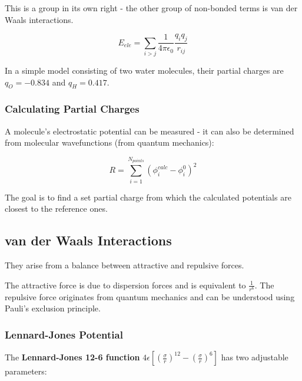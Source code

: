 \documentclass[
  letterpaper,
  DIV=11,
  numbers=noendperiod]{scrreprt}
\begin{document}
This is a group in its own right - the other group of non-bonded terms
is van der Waals interactions.

\begin{equation}
  E_{ele} = \sum_{i > j}\frac{1}{4\pi\epsilon_0}\frac{q_iq_j}{r_{ij}}
\end{equation}

In a simple model consisting of two water molecules, their partial
charges are \(q_O = -0.834\) and \(q_H = 0.417\).

\hypertarget{calculating-partial-charges}{%
\subsubsection{Calculating Partial
Charges}\label{calculating-partial-charges}}

A molecule's electrostatic potential can be measured - it can also be
determined from molecular wavefunctions (from quantum mechanics):

\begin{equation}
  R = \sum_{i = 1}^{N_{points}}(\phi_i^{calc} - \phi_i^0)^2
\end{equation}

The goal is to find a set partial charge from which the calculated
potentials are closest to the reference ones.

\hypertarget{van-der-waals-interactions}{%
\subsection{van der Waals
Interactions}\label{van-der-waals-interactions}}

They arise from a balance between attractive and repulsive forces.

The attractive force is due to dispersion forces and is equivalent to
\(\displaystyle \frac{1}{r^6}\). The repulsive force originates from
quantum mechanics and can be understood using Pauli's exclusion
principle.

\hypertarget{lennard-jones-potential}{%
\subsubsection{Lennard-Jones Potential}\label{lennard-jones-potential}}

The \textbf{Lennard-Jones 12-6 function}
\(\displaystyle 4\epsilon\left[\left(\frac{\sigma}{r}\right)^{12} - \left(\frac{\sigma}{r}\right)^6\right]\)
has two adjustable parameters:
\end{document}
